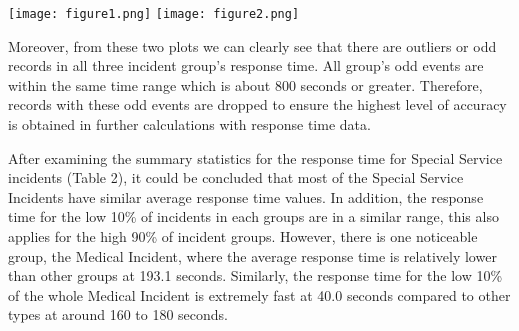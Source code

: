 \documentclass[
]{article}
\begin{document}
\texttt{[image: figure1.png]} \texttt{[image: figure2.png]}

Moreover, from these two plots we can clearly see that there are
outliers or odd records in all three incident group's response time. All
group's odd events are within the same time range which is about 800
seconds or greater. Therefore, records with these odd events are dropped
to ensure the highest level of accuracy is obtained in further
calculations with response time data.

After examining the summary statistics for the response time for Special
Service incidents (Table 2), it could be concluded that most of the
Special Service Incidents have similar average response time values. In
addition, the response time for the low 10\% of incidents in each groups
are in a similar range, this also applies for the high 90\% of incident
groups. However, there is one noticeable group, the Medical Incident,
where the average response time is relatively lower than other groups at
193.1 seconds. Similarly, the response time for the low 10\% of the
whole Medical Incident is extremely fast at 40.0 seconds compared to
other types at around 160 to 180 seconds.
\end{document}
